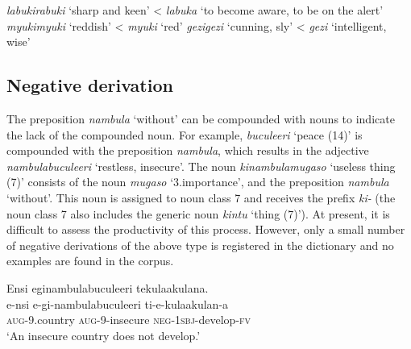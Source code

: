 \ea \label{ex-derivation-adjectives-morepatterns}
\begin{xlist}
\ex \textit{labukirabuki} `sharp and keen' <  \textit{labuka} `to become aware, to be on the alert' 
\ex \textit{myukimyuki} `reddish' < \textit{myuki} `red'
\ex  \textit{gezigezi} `cunning, sly' < \textit{gezi} `intelligent, wise'
\end{xlist}
\z


\subsection{Negative derivation} \label{sec-derivation-negative}

The preposition \textit{nambula} `without' can be compounded with nouns to indicate the lack of the compounded noun. 
For example, \textit{buculeeri} `peace (14)' is compounded with the preposition \textit{nambula}, which results in the adjective \textit{nambulabuculeeri} `restless, insecure'. 
The noun \textit{kinambulamugaso} `useless thing (7)' consists of the noun \textit{mugaso} `3.importance', 
and the preposition \textit{nambula} `without'. 
This noun is assigned to noun class 7 and receives the prefix \textit{ki-} 
(the noun class 7 also includes the generic noun \textit{kintu} `thing (7)').
At present, it is difficult to assess the productivity of this process. 
However, only a  small number of negative derivations of the above type is registered in the dictionary and no examples are found in the corpus.

\ea 	\label{ex-ruuliwithout}
	\glll Ensi eginambulabuculeeri tekulaakulana.\\
  e-nsi e-gi-nambulabuculeeri ti-e-kulaakulan-a\\
		\textsc{aug}-9.country \textsc{aug}-9-insecure \textsc{neg}-\textsc{1sbj}-develop-\textsc{fv}\\
\glt ‘An insecure country does not develop.'
\z
